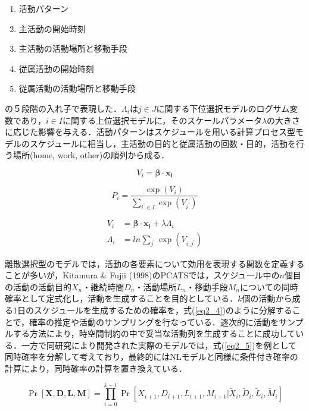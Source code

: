 \begin{enumerate}
	\item 活動パターン
	\item 主活動の開始時刻
	\item 主活動の活動場所と移動手段
	\item 従属活動の開始時刻
	\item 従属活動の活動場所と移動手段
\end{enumerate}

の５段階の入れ子で表現した．$\Lambda_{i}$は$j \in J$に関する下位選択モデルのログサム変数であり，$i \in I$に関する上位選択モデルに，そのスケールパラメータ$ \lambda$の大きさに応じた影響を与える．活動パターンはスケジュールを用いる計算プロセス型モデルのスケジュールに相当し，主活動の目的と従属活動の回数・目的，活動を行う場所(home, work, other)の順列から成る．

\begin{equation} \label{eq2_1}
	V_{i} = \bm{\beta} \cdot \bm{x_{i}}
\end{equation}

\begin{equation} \label{eq2_2}
	P_{i} = \frac{\exp(V_{i})}{\sum_{i^{'} \in I} \exp(V_{i^{'}})}
\end{equation}

\begin{equation} \label{eq2_3}
	\begin{split}
		V_{i} &= \bm{\beta} \cdot \bm{x_{i}} + \lambda  \Lambda_{i}\\
		\Lambda_{i} &= ln \sum_{j^{'}}\exp(V_{i,j^{'}})
	\end{split}
\end{equation}


	
離散選択型のモデルでは，活動の各要素について効用を表現する関数を定義することが多いが，Kitamura \& Fujii (1998)のPCATSでは，スケジュール中の$n$個目の活動の活動目的$X_n$・継続時間$D_n$・活動場所$L_n$・移動手段$M_n$についての同時確率として定式化し，活動を生成することを目的としている．$k$個の活動から成る1日のスケジュールを生成するための確率を，式(\ref{eq2_4})のように分解することで，確率の推定や活動のサンプリングを行なっている．逐次的に活動をサンプルする方法により，時空間制約の中で妥当な活動列を生成することに成功している．一方で同研究により開発された実際のモデルでは，式(\ref{eq2_5})を例として同時確率を分解して考えており，最終的にはNLモデルと同様に条件付き確率の計算により，同時確率の計算を置き換えている．

\begin{equation} \label{eq2_4}
	\Pr[\bm{X, D, L, M}] = \prod_{i=0}^{k-1} \Pr[X_{i+1}, D_{i+1}, L_{i+1}, M_{i+1} | \tilde{X}_{i}, \tilde{D}_{i}, \tilde{L}_{i}, \tilde{M}_{i}]
\end{equation}

